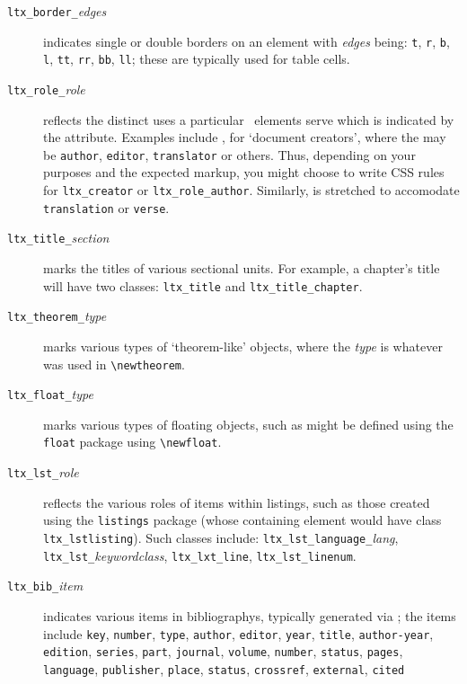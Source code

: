 \documentclass{book}
\begin{document}
\begin{description}
\begin{description}
  \end{description}
\item[\texttt{ltx\_border\_}\textit{edges}]
   indicates single or double borders on an element with \textit{edges} being:
   \texttt{t}, \texttt{r}, \texttt{b}, \texttt{l},
   \texttt{tt}, \texttt{rr}, \texttt{bb}, \texttt{ll};
   these are typically used for table cells.
\item[\texttt{ltx\_role\_}\textit{role}]
  reflects the distinct uses a particular \LaTeXML\ elements serve
  which is indicated by the  attribute.  Examples include ,
  for `document creators', where the  may be \texttt{author}, \texttt{editor},
  \texttt{translator} or others.
  Thus, depending on your purposes and the expected markup, you might choose to write
  CSS rules for \texttt{ltx\_creator} or \texttt{ltx\_role\_author}.
  Similarly,  is stretched to accomodate \texttt{translation} or \texttt{verse}.
\item[\texttt{ltx\_title\_}\textit{section}]
  marks the titles of various sectional units.
  For example, a chapter's title will have two classes: \texttt{ltx\_title}
  and \texttt{ltx\_title\_chapter}.
\item[\texttt{ltx\_theorem\_}\textit{type}]
   marks various types of `theorem-like' objects, where the \textit{type} is
   whatever was used in \verb|\newtheorem|.
\item[\texttt{ltx\_float\_}\textit{type}]
   marks various types of floating objects, such as might be defined using
   the \texttt{float} package using \verb|\newfloat|.
\item[\texttt{ltx\_lst\_}\textit{role}]
  reflects the various roles of items within listings,
  such as those created using the \texttt{listings} package
  (whose containing element would have class \texttt{ltx\_lstlisting}).
  Such classes include:
 \texttt{ltx\_lst\_language\_}\textit{lang}, \texttt{ltx\_lst\_}\textit{keywordclass},
 \texttt{ltx\_lxt\_line}, \texttt{ltx\_lst\_linenum}.
\item[\texttt{ltx\_bib\_}\textit{item}]
  indicates various items in bibliographys, typically generated via \BibTeX;
  the items include
  \texttt{key}, \texttt{number}, \texttt{type}, \texttt{author}, \texttt{editor},
   \texttt{year}, \texttt{title}, \texttt{author-year}, \texttt{edition},
   \texttt{series}, \texttt{part}, \texttt{journal}, \texttt{volume}, \texttt{number},
   \texttt{status}, \texttt{pages}, \texttt{language}, \texttt{publisher},
   \texttt{place}, \texttt{status}, \texttt{crossref}, \texttt{external}, \texttt{cited}

\end{description}
\end{document}
